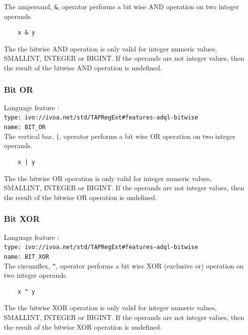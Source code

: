 \documentclass[11pt,a4paper]{ivoa}
\begin{document}
The ampersand, \verb:&:, operator performs a bit wise AND operation
on two integer operands.

\begin{verbatim}
    x & y
\end{verbatim}

The the bitwise AND operation is only valid for integer numeric values,
SMALLINT, INTEGER or BIGINT.
If the operands are not integer values, then the result of the bitwise
AND operation is undefined.

\subsubsection{Bit OR}
\label{sec:bitwise.or}
{\footnotesize Language feature :}\\
{\footnotesize \verb|type: ivo://ivoa.net/std/TAPRegExt#features-adql-bitwise|}\\
{\footnotesize \verb|name: BIT_OR|}\\

The vertical bar, \verb:|:, operator performs a bit wise OR operation
on two integer operands.

\begin{verbatim}
    x | y
\end{verbatim}

The the bitwise OR operation is only valid for integer numeric values, 
SMALLINT, INTEGER or BIGINT.
If the operands are not integer values, then the result of the bitwise OR
operation is undefined.

\subsubsection{Bit XOR}
\label{sec:bitwise.xor}
{\footnotesize Language feature :}\\
{\footnotesize \verb|type: ivo://ivoa.net/std/TAPRegExt#features-adql-bitwise|}\\
{\footnotesize \verb|name: BIT_XOR|}\\

The circumflex, \verb:^:, operator performs a bit wise XOR (exclusive or)
operation on two integer operands.

\begin{verbatim}
    x ^ y
\end{verbatim}

The the bitwise XOR operation is only valid for integer numeric values, 
SMALLINT, INTEGER or BIGINT.
If the operands are not integer values, then the result of the bitwise
XOR operation is undefined.
\end{document}
